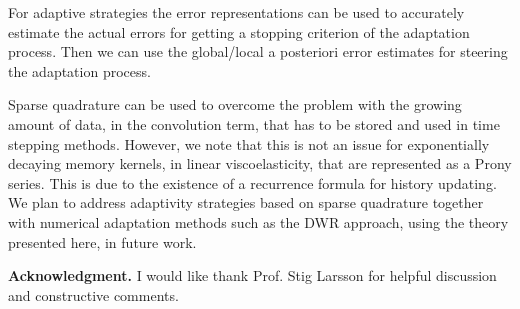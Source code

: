 \documentclass{amsart}
\numberwithin{equation}{section}
\theoremstyle{definition}
\begin{document}
For adaptive strategies the error representations can be used to 
accurately estimate the actual errors for getting a stopping criterion of 
the adaptation process. Then we can use the global/local a posteriori 
error estimates for steering the adaptation process. 

Sparse quadrature can be used to overcome  the problem 
with the growing amount of data, in the convolution term, 
that has to be stored and used in time stepping methods. 
However, we note that this is not an issue for exponentially decaying 
memory kernels, in linear viscoelasticity, that are represented as a Prony series.  
This is due to the existence of a recurrence formula for history updating. 
We plan to address adaptivity strategies based on sparse quadrature 
together with numerical adaptation methods such as the DWR approach, 
using the theory presented here, in future work.  

\textbf{Acknowledgment.} 
I would like thank Prof. Stig Larsson for helpful discussion and 
constructive comments. 



\end{document}
